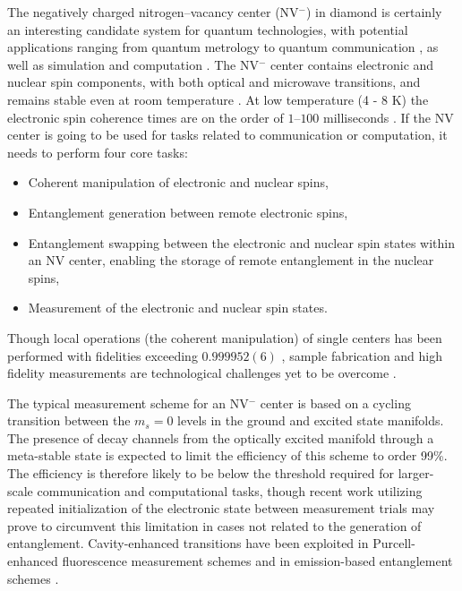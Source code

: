 \documentclass[aps,pra,amsmath,amssymb,reprint,superscriptaddress,tightenlines]{revtex4-1}
\begin{document}
The negatively charged nitrogen--vacancy center (NV$^-$) in diamond is certainly an interesting candidate system for quantum technologies, with potential applications ranging from quantum metrology \cite{Taylor08,Maze08,Balasubramanian08,Acosta09,Pham11,Dolde11,Maletinsky12,Barry16} to quantum communication \cite{Childress05,Childress06,Childress13}, as well as simulation and computation  \cite{Wrachtrup01,Nizovtsev05,Trajkov05,Ladd10,Weber10,Yang11,Childress13,Casanova16}. The NV$^-$ center contains electronic and nuclear spin components, with both optical and microwave transitions, and remains stable even at room temperature \cite{Doherty13}. At low temperature (4 - 8 K) the electronic spin coherence times are on the order of $1$--$100$ milliseconds \cite{Yang16,Balasubramanian09,McLellan16}. If the NV center is going to be used for tasks related to communication or computation, it needs to perform four core tasks:
\begin{itemize}
	\setlength{\itemsep}{1pt}
	\setlength{\parskip}{0pt}
	\setlength{\parsep}{0pt}
	\item Coherent manipulation of electronic and nuclear spins,
	\item Entanglement generation between remote electronic spins,
	\item Entanglement swapping between the electronic and nuclear spin states within an NV center, enabling the storage of remote entanglement in the nuclear spins,
	\item Measurement of the electronic and nuclear spin states.
\end{itemize}
Though local operations (the coherent manipulation) of single centers has been performed with fidelities exceeding $0.999952(6)$ \cite{Rong15}, sample fabrication and high fidelity measurements are technological challenges yet to be overcome \cite{Greentree06,Gupta16}. 

The typical measurement scheme for an NV$^-$ center is based on a cycling transition between the $m_s=0$ levels in the ground and excited state manifolds. The presence of decay channels from the optically excited manifold through a meta-stable state is expected to limit the efficiency of this scheme to order 99\%. The efficiency is therefore likely to be below the threshold required for larger-scale communication and computational tasks, though recent work utilizing repeated initialization of the electronic state between measurement trials \cite{Jiang09} may prove to circumvent this limitation in cases not related to the generation of entanglement. Cavity-enhanced transitions have been exploited in Purcell-enhanced fluorescence measurement schemes \cite{Wolters10,Faraon11,Faraon12} and in emission-based entanglement schemes \cite{Lim05,Barrett05,Jiang07}.
\end{document}
